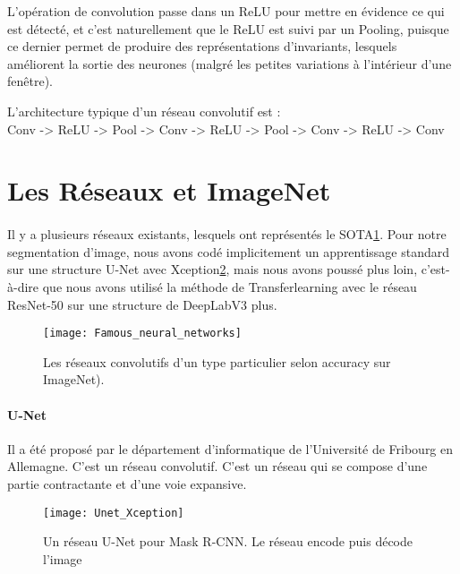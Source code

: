 \documentclass[
10pt, %
a4paper, %
oneside, %
headinclude,footinclude, %
]{scrartcl}
\begin{document}
L’opération de convolution passe dans un \gls{ReLU} pour mettre en évidence ce qui est détecté, et c’est naturellement que le ReLU est suivi par un Pooling, puisque ce dernier permet de produire des représentations d’invariants, lesquels améliorent la sortie des neurones (malgré les petites variations à l’intérieur d’une fenêtre).

L’architecture typique d’un réseau convolutif est : \\
Conv -> ReLU -> Pool -> Conv -> ReLU -> Pool -> Conv -> ReLU -> Conv

\section{Les Réseaux et ImageNet}

\paragraph{}Il y a plusieurs réseaux existants, lesquels ont représentés le SOTA\ref{fig:Famous_neural_networks}. Pour notre segmentation d’image, nous avons codé implicitement un apprentissage standard sur une structure U-Net avec Xception\ref{fig:Unet_Xception}, mais nous avons poussé plus loin, c’est-à-dire que nous avons utilisé la méthode de \gls{Transferlearning} avec le réseau  ResNet-50 sur une structure de DeepLabV3 plus.
\begin{figure}[htb]
\centering 
\texttt{[image: Famous\_neural\_networks]} 
\caption[Les Réseaux Convolutifs sur ImageNet]{Les réseaux convolutifs d’un type particulier selon accuracy sur ImageNet).} %
\label{fig:Famous_neural_networks} 
\end{figure}

\paragraph{U-Net}
Il a été proposé par le département d’informatique de l’Université de Fribourg en Allemagne. C’est un réseau convolutif. C’est un réseau qui se compose d’une partie contractante et d’une voie expansive.
\begin{figure}[htb]
\centering 
\texttt{[image: Unet\_Xception]} 
\caption[U-Net]{Un réseau U-Net pour Mask R-CNN. Le réseau encode puis décode l’image} %
\label{fig:Unet_Xception} 
\end{figure}
\end{document}
